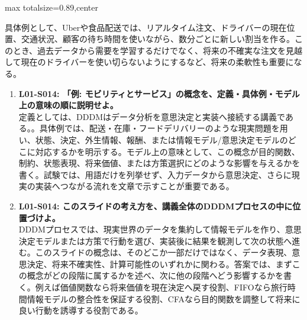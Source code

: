 \begin{minipage}[t]{0.58\textwidth}
\begin{adjustbox}{max totalsize={\textwidth}{0.89\textheight},center}
\begin{minipage}{\textwidth}
具体例として、Uberや食品配送では、リアルタイム注文、ドライバーの現在位置、交通状況、顧客の待ち時間を使いながら、数分ごとに新しい割当を作る。このとき、過去データから需要を学習するだけでなく、将来の不確実な注文を見越して現在のドライバーを使い切らないようにするなど、将来の柔軟性も重要になる。\par{}\begin{enumerate}\item \textbf{L01-S014: 「例: モビリティとサービス」の概念を、定義・具体例・モデル上の意味の順に説明せよ。}\\定義としては、DDDMはデータ分析を意思決定と実装へ接続する講義である。。具体例では、配送・在庫・フードデリバリーのような現実問題を用い、状態、決定、外生情報、報酬、または情報モデル/意思決定モデルのどこに対応するかを明示する。モデル上の意味として、この概念が目的関数、制約、状態表現、将来価値、または方策選択にどのような影響を与えるかを書く。試験では、用語だけを列挙せず、入力データから意思決定、さらに現実の実装へつながる流れを文章で示すことが重要である。\item \textbf{L01-S014: このスライドの考え方を、講義全体のDDDMプロセスの中に位置づけよ。}\\DDDMプロセスでは、現実世界のデータを集約して情報モデルを作り、意思決定モデルまたは方策で行動を選び、実装後に結果を観測して次の状態へ進む。このスライドの概念は、そのどこか一部だけではなく、データ表現、意思決定、将来不確実性、計算可能性のいずれかに関わる。答案では、まずこの概念がどの段階に属するかを述べ、次に他の段階へどう影響するかを書く。例えば価値関数なら将来価値を現在決定へ戻す役割、FIFOなら旅行時間情報モデルの整合性を保証する役割、CFAなら目的関数を調整して将来に良い行動を誘導する役割である。\end{enumerate}
\end{minipage}
\end{adjustbox}
\end{minipage}


